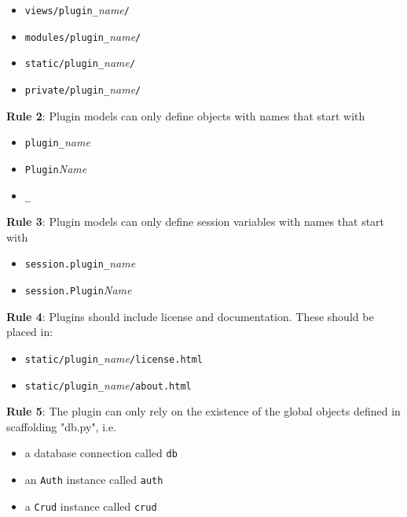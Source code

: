 \documentclass[justified,sixbynine,notoc]{tufte-book}
\def\ft{\small\tt}
\begin{document}
\begin{fullwidth}
\begin{itemize}
\item {\ft views/plugin\_}{\it name}{\ft /}

\item {\ft modules/plugin\_}{\it name}{\ft /}

\item {\ft static/plugin\_}{\it name}{\ft /}

\item {\ft private/plugin\_}{\it name}{\ft /}
\end{itemize}

{\bf Rule 2}:
Plugin models can only define objects with names that start with
\begin{itemize}
\item {\ft plugin\_}{\it name}

\item {\ft Plugin}{\it Name}

\item {\ft \_}
\end{itemize}

{\bf Rule 3}:
Plugin models can only define session variables with names that start with
\begin{itemize}
\item {\ft session.plugin\_}{\it name}

\item {\ft session.Plugin}{\it Name}
\end{itemize}

{\bf Rule 4}:
Plugins should include license and documentation. These should be placed in:
\begin{itemize}
\item {\ft static/plugin\_}{\it name}{\ft /license.html}

\item {\ft static/plugin\_}{\it name}{\ft /about.html}
\end{itemize}

{\bf Rule 5}:
The plugin can only rely on the existence of the global objects defined in scaffolding "db.py", i.e.

\begin{itemize}
\item a database connection called {\ft db}

\item an {\ft Auth} instance called {\ft auth}

\item a {\ft Crud} instance called {\ft crud}


\end{itemize}
\end{fullwidth}
\end{document}
